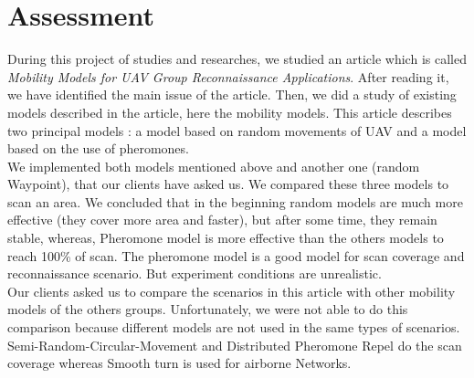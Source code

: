 \part{Assessment}

During this project of studies and researches, we studied an article which is called \textit{Mobility Models for UAV Group Reconnaissance Applications}. After reading it, we have identified the main issue of the article. Then, we did a study of existing models described in the article, here the mobility models. This article describes two principal models : a model based on random movements of UAV and a model based on the use of pheromones.\\

\noindent We implemented both models mentioned above and another one (random Waypoint), that our clients have asked us. We compared these three models to scan an area. We concluded that in the beginning random models are much more effective (they cover more area and faster), but after some time, they remain stable, whereas, Pheromone model is more effective than the others models to reach 100\% of scan. The pheromone model is a good model for scan coverage and reconnaissance scenario. But experiment conditions are unrealistic.\\

\noindent Our clients asked us to compare the scenarios in this article with other mobility models of the others groups.
Unfortunately, we were not able to do this comparison because different models are not used in the same types of scenarios. Semi-Random-Circular-Movement and Distributed Pheromone Repel do the scan coverage whereas Smooth turn is used for airborne Networks.


